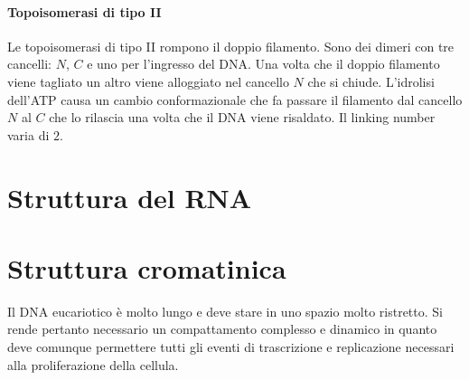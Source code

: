 \paragraph{Topoisomerasi di tipo II}
Le topoisomerasi di tipo II rompono il doppio filamento. Sono dei dimeri con tre cancelli: $N$, $C$ e uno per l'ingresso del DNA. Una volta che il doppio filamento viene tagliato un
altro viene alloggiato nel cancello $N$ che si chiude. L'idrolisi dell'ATP causa un cambio conformazionale che fa passare il filamento dal cancello $N$ al $C$ che lo rilascia una volta
che il DNA viene risaldato. Il linking number varia di $2$. 
\section{Struttura del RNA}


\section{Struttura cromatinica}
Il DNA eucariotico \`e molto lungo e deve stare in uno spazio molto ristretto. Si rende pertanto necessario un compattamento complesso e dinamico in quanto deve comunque permettere 
tutti gli eventi di trascrizione e replicazione necessari alla proliferazione della cellula. 







